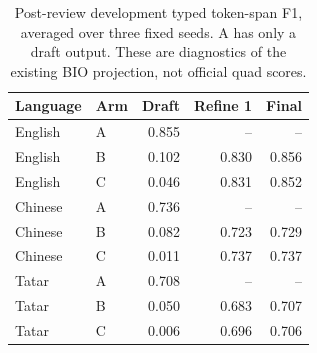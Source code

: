 \begin{table}[t]
\centering\small
\setlength{\tabcolsep}{3pt}
\caption{Post-review development typed token-span F1, averaged over three fixed seeds. A has only a draft output. These are diagnostics of the existing BIO projection, not official quad scores.}\label{tab:stages}
\begin{tabular}{llrrr}
\toprule
Language & Arm & Draft & Refine 1 & Final \\
\midrule
English & A & 0.855 & -- & -- \\
English & B & 0.102 & 0.830 & 0.856 \\
English & C & 0.046 & 0.831 & 0.852 \\
Chinese & A & 0.736 & -- & -- \\
Chinese & B & 0.082 & 0.723 & 0.729 \\
Chinese & C & 0.011 & 0.737 & 0.737 \\
Tatar & A & 0.708 & -- & -- \\
Tatar & B & 0.050 & 0.683 & 0.707 \\
Tatar & C & 0.006 & 0.696 & 0.706 \\
\bottomrule
\end{tabular}
\end{table}
